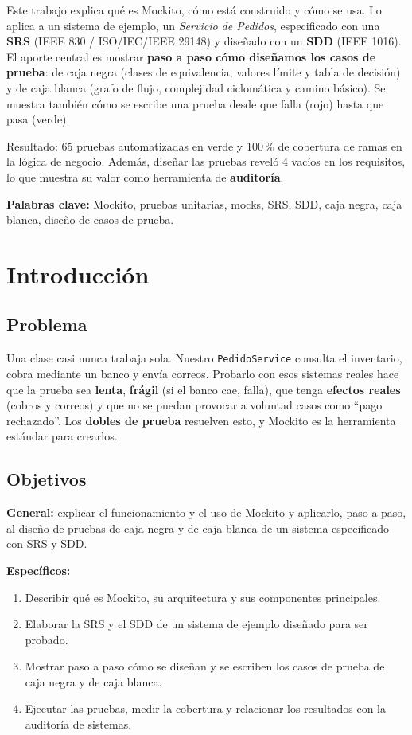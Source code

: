 \documentclass[11pt,a4paper,oneside]{report}
\newcommand{\code}[1]{\texttt{#1}}
\begin{document}
Este trabajo explica qué es Mockito, cómo está construido y cómo se usa. Lo aplica a un sistema de ejemplo, un \emph{Servicio de Pedidos}, especificado con una \textbf{SRS} (IEEE 830 / ISO/IEC/IEEE 29148) y diseñado con un \textbf{SDD} (IEEE 1016). El aporte central es mostrar \textbf{paso a paso cómo diseñamos los casos de prueba}: de caja negra (clases de equivalencia, valores límite y tabla de decisión) y de caja blanca (grafo de flujo, complejidad ciclomática y camino básico). Se muestra también cómo se escribe una prueba desde que falla (rojo) hasta que pasa (verde).

Resultado: 65 pruebas automatizadas en verde y 100\,\% de cobertura de ramas en la lógica de negocio. Además, diseñar las pruebas reveló 4 vacíos en los requisitos, lo que muestra su valor como herramienta de \textbf{auditoría}.

\medskip\noindent\textbf{Palabras clave:} Mockito, pruebas unitarias, mocks, SRS, SDD, caja negra, caja blanca, diseño de casos de prueba.

\tableofcontents
\clearpage
{}

\chapter{Introducción}
\section{Problema}
Una clase casi nunca trabaja sola. Nuestro \code{PedidoService} consulta el inventario, cobra mediante un banco y envía correos. Probarlo con esos sistemas reales hace que la prueba sea \textbf{lenta}, \textbf{frágil} (si el banco cae, falla), que tenga \textbf{efectos reales} (cobros y correos) y que no se puedan provocar a voluntad casos como ``pago rechazado''. Los \textbf{dobles de prueba} resuelven esto, y Mockito es la herramienta estándar para crearlos.

\section{Objetivos}
\textbf{General:} explicar el funcionamiento y el uso de Mockito y aplicarlo, paso a paso, al diseño de pruebas de caja negra y de caja blanca de un sistema especificado con SRS y SDD.

\textbf{Específicos:}
\begin{enumerate}
  \item Describir qué es Mockito, su arquitectura y sus componentes principales.
  \item Elaborar la SRS y el SDD de un sistema de ejemplo diseñado para ser probado.
  \item Mostrar paso a paso cómo se diseñan y se escriben los casos de prueba de caja negra y de caja blanca.
  \item Ejecutar las pruebas, medir la cobertura y relacionar los resultados con la auditoría de sistemas.
\end{enumerate}
\end{document}
